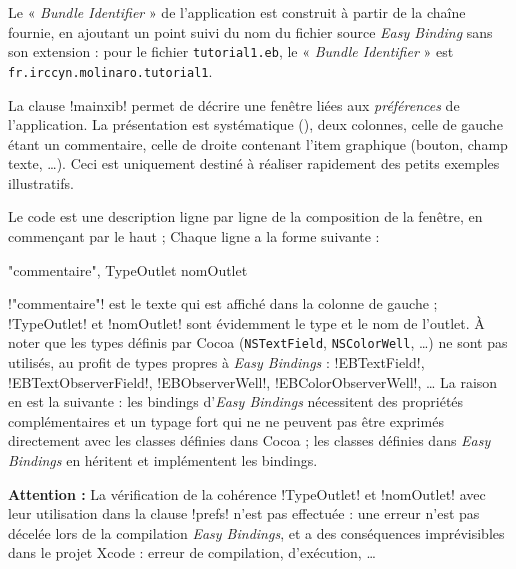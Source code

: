 Le « \emph{Bundle Identifier} » de l'application est construit à partir de la chaîne fournie, en ajoutant un point suivi du nom du fichier source \emph{Easy Binding} sans son extension : pour le fichier \texttt{tutorial1.eb}, le « \emph{Bundle Identifier} » est \texttt{fr.irccyn.molinaro.tutorial1}.





La clause \eb!mainxib! permet de décrire une fenêtre liées aux \emph{préférences} de l'application. La présentation est systématique (), deux colonnes, celle de gauche étant un commentaire, celle de droite contenant l'item graphique (bouton, champ texte, …). Ceci est uniquement destiné à réaliser rapidement des petits exemples illustratifs.

Le code est une description ligne par ligne de la composition de la fenêtre, en commençant par le haut ; Chaque ligne a la forme suivante : 
\begin{ebcode}
  {"commentaire", TypeOutlet nomOutlet}
\end{ebcode}

\eb!"commentaire"! est le texte qui est affiché dans la colonne de gauche ; \eb!TypeOutlet! et \eb!nomOutlet! sont évidemment le type et le nom de l'outlet. À noter que les types définis par Cocoa (\texttt{NSTextField}, \texttt{NSColorWell}, …) ne sont pas utilisés, au profit de types propres à \emph{Easy Bindings} : \eb!EBTextField!,  \eb!EBTextObserverField!, \eb!EBObserverWell!, \eb!EBColorObserverWell!, … La raison en est la suivante : les bindings d'\emph{Easy Bindings} nécessitent des propriétés complémentaires et un typage fort qui ne ne peuvent pas être exprimés directement avec les classes définies dans Cocoa ; les classes définies dans \emph{Easy Bindings} en héritent et implémentent les bindings.

{\bf Attention : } La vérification de la cohérence \eb!TypeOutlet! et \eb!nomOutlet! avec leur utilisation dans la clause \eb!prefs! n'est pas effectuée : une erreur n'est pas décelée lors de la compilation \emph{Easy Bindings}, et a des conséquences imprévisibles dans le projet Xcode : erreur de compilation, d'exécution, …











